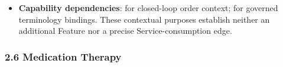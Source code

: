 \begin{itemize}
\begin{itemize}
\begin{itemize}
\item 
\emph{Function}: \texttt{} — Normalises and distributes structured diagnostic observations, reference ranges, and diagnostic image study links into the LHR.



\item 
\emph{Exposed Service}: \texttt{} — Publishes verified diagnostic reports across the enterprise.



\end{itemize}


\end{itemize}


\item 
\textbf{Capability dependencies}: \texttt{} for closed-loop order context; \texttt{} for governed terminology bindings. These contextual purposes establish neither an additional Feature nor a precise Service-consumption edge.



\end{itemize}
\label{rad:sd:142}

\par\smallskip
{}\label{rad:sd:144}



\label{rad:sd:146}
\subsubsection*{2.6 Medication Therapy}
\label{rad:sd:147}

